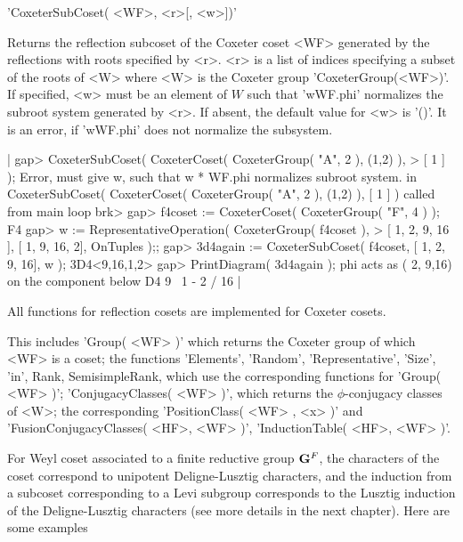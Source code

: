 
'CoxeterSubCoset( <WF>, <r>[, <w>])'

Returns the  reflection subcoset of  the Coxeter  coset <WF> generated by
the  reflections with roots  specified by <r>.  <r> is  a list of indices
specifying a subset  of the roots of <W>  where <W> is the  Coxeter group
'CoxeterGroup(<WF>)'.  If specified,  <w> must be  an element of $W$ such
that 'w\*WF.phi'  normalizes the subroot system  generated by <r>.  If
absent,   the  default value   for  <w>  is '()'.   It    is an error, if
'w\*WF.phi' does not normalize the subsystem.

|    gap> CoxeterSubCoset( CoxeterCoset( CoxeterGroup( "A", 2 ), (1,2) ),
    >                                                              [ 1 ] );
    Error, must give w, such that w * WF.phi normalizes subroot system.
     in
    CoxeterSubCoset( CoxeterCoset( CoxeterGroup( "A", 2 ), (1,2) ), [ 1 ]
     ) called from
    main loop
    brk>
    gap> f4coset := CoxeterCoset( CoxeterGroup( "F", 4 ) );
    F4
    gap> w := RepresentativeOperation( CoxeterGroup( f4coset ),
    >                      [ 1, 2, 9, 16 ], [ 1, 9, 16, 2], OnTuples );;
    gap> 3d4again := CoxeterSubCoset( f4coset, [ 1, 2, 9, 16], w );
    3D4<9,16,1,2>
    gap> PrintDiagram( 3d4again );
    phi acts as ( 2, 9,16) on the component below
    D4   9
          \
           1 - 2
          /
         16 |

\Section{Functions on Coxeter cosets}

All functions for reflection cosets are implemented for Coxeter cosets.

This includes 'Group( <WF> )' which returns the Coxeter group of which <WF>
is  a coset; the functions  'Elements', 'Random', 'Representative', 'Size',
'in',  Rank,  SemisimpleRank,  which  use  the  corresponding functions for
'Group(   <WF>   )';   'ConjugacyClasses(   <WF>   )',  which  returns  the
$\phi$-conjugacy  classes of <W>; the  corresponding 'PositionClass( <WF> ,
<x>  )' and 'FusionConjugacyClasses( <HF>,  <WF> )', 'InductionTable( <HF>,
<WF> )'.

For  Weyl  coset  associated  to  a  finite  reductive  group  ${\bf G}^F$, the
characters of the coset correspond to unipotent Deligne-Lusztig characters,
and  the  induction  from  a  subcoset  corresponding  to  a  Levi subgroup
corresponds to the Lusztig induction of the Deligne-Lusztig characters (see
more details in the next chapter). Here are some examples\:\

